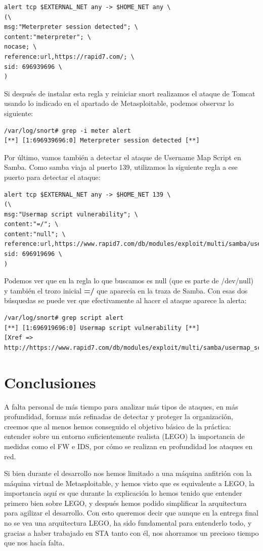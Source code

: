 \documentclass[a4paper,12pt]{scrartcl}
\begin{document}
\begin{verbatim}
alert tcp $EXTERNAL_NET any -> $HOME_NET any \
(\
msg:"Meterpreter session detected"; \
content:"meterpreter"; \
nocase; \
reference:url,https://rapid7.com/; \
sid: 696939696 \
)
\end{verbatim}

Si después de instalar esta regla y reiniciar snort realizamos el ataque de Tomcat usando lo indicado en el apartado de Metasploitable, podemos observar lo siguiente:

\begin{verbatim}
/var/log/snort# grep -i meter alert 
[**] [1:696939696:0] Meterpreter session detected [**]
\end{verbatim}

Por último, vamos también a detectar el ataque de Username Map Script en Samba. Como samba viaja al puerto 139, utilizamos la siguiente regla a ese puerto para detectar el ataque:

\begin{lstlisting}[breaklines]
alert tcp $EXTERNAL_NET any -> $HOME_NET 139 \
(\
msg:"Usermap script vulnerability"; \
content:"=/"; \
content:"null"; \
reference:url,https://www.rapid7.com/db/modules/exploit/multi/samba/usermap_script;\
sid: 696919696 \
)
\end{lstlisting}

\noindent Podemos ver que en la regla lo que buscamos es null (que es parte de /dev/null) y también el trozo inicial \textbf{=/} que aparecía en la traza de Samba. Con esas dos búsquedas se puede ver que efectivamente al hacer el ataque aparece la alerta:

\begin{lstlisting}[breaklines]
/var/log/snort# grep script alert
[**] [1:696919696:0] Usermap script vulnerability [**]
[Xref => http://https://www.rapid7.com/db/modules/exploit/multi/samba/usermap_script]
\end{lstlisting}

\section{Conclusiones}

A falta personal de más tiempo para analizar más tipos de ataques, en más profundidad, formas más refinadas de detectar y proteger la organización, creemos que al menos hemos conseguido el objetivo básico de la práctica: entender sobre un entorno suficientemente realista (LEGO) la importancia de medidas como el FW e IDS, por cómo se realizan en profundidad los ataques en red.

Si bien durante el desarrollo nos hemos limitado a una máquina anfitrión con la máquina virtual de Metasploitable, y hemos visto que es equivalente a LEGO, la importancia aquí es que durante la explicación lo hemos tenido que entender primero bien sobre LEGO, y después hemos podido simplificar la arquitectura para agilizar el desarrollo. Con esto queremos decir que aunque en la entrega final no se vea una arquitectura LEGO, ha sido fundamental para entenderlo todo, y gracias a haber trabajado en STA tanto con él, nos ahorramos un precioso tiempo que nos hacía falta.



\end{document}
